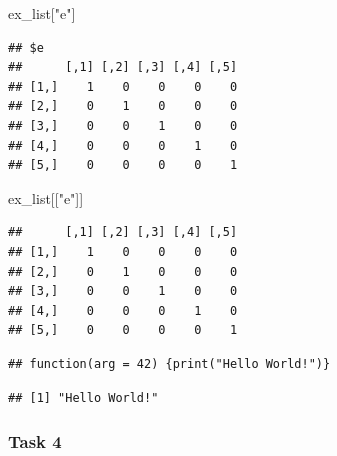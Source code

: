 \documentclass[]{book}
\newenvironment{Shaded}{\begin{snugshade}}{\end{snugshade}}
\newcommand{\KeywordTok}[1]{\textcolor[rgb]{0.13,0.29,0.53}{\textbf{#1}}}
\newcommand{\DataTypeTok}[1]{\textcolor[rgb]{0.13,0.29,0.53}{#1}}
\newcommand{\DecValTok}[1]{\textcolor[rgb]{0.00,0.00,0.81}{#1}}
\newcommand{\StringTok}[1]{\textcolor[rgb]{0.31,0.60,0.02}{#1}}
\newcommand{\OperatorTok}[1]{\textcolor[rgb]{0.81,0.36,0.00}{\textbf{#1}}}
\newcommand{\NormalTok}[1]{#1}
\theoremstyle{definition}
\theoremstyle{definition}
\theoremstyle{definition}
\theoremstyle{remark}
\begin{document}
\begin{Shaded}
\begin{Highlighting}[]
\NormalTok{ex_list[}\StringTok{"e"}\NormalTok{]}
\end{Highlighting}
\end{Shaded}

\begin{verbatim}
## $e
##      [,1] [,2] [,3] [,4] [,5]
## [1,]    1    0    0    0    0
## [2,]    0    1    0    0    0
## [3,]    0    0    1    0    0
## [4,]    0    0    0    1    0
## [5,]    0    0    0    0    1
\end{verbatim}

\begin{Shaded}
\begin{Highlighting}[]
\NormalTok{ex_list[[}\StringTok{"e"}\NormalTok{]]}
\end{Highlighting}
\end{Shaded}

\begin{verbatim}
##      [,1] [,2] [,3] [,4] [,5]
## [1,]    1    0    0    0    0
## [2,]    0    1    0    0    0
## [3,]    0    0    1    0    0
## [4,]    0    0    0    1    0
## [5,]    0    0    0    0    1
\end{verbatim}

\begin{Shaded}
\end{Shaded}

\begin{verbatim}
## function(arg = 42) {print("Hello World!")}
\end{verbatim}

\begin{Shaded}
\end{Shaded}

\begin{verbatim}
## [1] "Hello World!"
\end{verbatim}

\subsubsection{Task 4}\label{task-4}
\end{document}
